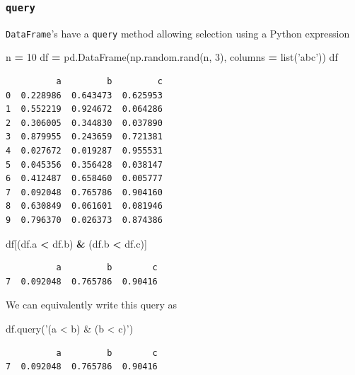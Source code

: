 \documentclass[
  letterpaper,
]{scrbook}
\newenvironment{Shaded}{\begin{snugshade}}{\end{snugshade}}
\newcommand{\BuiltInTok}[1]{#1}
\newcommand{\DecValTok}[1]{\textcolor[rgb]{0.00,0.00,0.81}{#1}}
\newcommand{\NormalTok}[1]{#1}
\newcommand{\OperatorTok}[1]{\textcolor[rgb]{0.81,0.36,0.00}{\textbf{#1}}}
\newcommand{\StringTok}[1]{\textcolor[rgb]{0.31,0.60,0.02}{#1}}
\begin{document}
\hypertarget{query}{%
\subsubsection{\texorpdfstring{\texttt{query}}{query}}\label{query}}

\texttt{DataFrame}'s have a \texttt{query} method allowing selection using a Python expression

\begin{Shaded}
\begin{Highlighting}[]
\NormalTok{n }\OperatorTok{=} \DecValTok{10}
\NormalTok{df }\OperatorTok{=}\NormalTok{ pd.DataFrame(np.random.rand(n, }\DecValTok{3}\NormalTok{), columns }\OperatorTok{=} \BuiltInTok{list}\NormalTok{(}\StringTok{'abc'}\NormalTok{))}
\NormalTok{df}
\end{Highlighting}
\end{Shaded}

\begin{verbatim}
          a         b         c
0  0.228986  0.643473  0.625953
1  0.552219  0.924672  0.064286
2  0.306005  0.344830  0.037890
3  0.879955  0.243659  0.721381
4  0.027672  0.019287  0.955531
5  0.045356  0.356428  0.038147
6  0.412487  0.658460  0.005777
7  0.092048  0.765786  0.904160
8  0.630849  0.061601  0.081946
9  0.796370  0.026373  0.874386
\end{verbatim}

\begin{Shaded}
\begin{Highlighting}[]
\NormalTok{df[(df.a }\OperatorTok{<}\NormalTok{ df.b) }\OperatorTok{&}\NormalTok{ (df.b }\OperatorTok{<}\NormalTok{ df.c)]}
\end{Highlighting}
\end{Shaded}

\begin{verbatim}
          a         b        c
7  0.092048  0.765786  0.90416
\end{verbatim}

We can equivalently write this query as

\begin{Shaded}
\begin{Highlighting}[]
\NormalTok{df.query(}\StringTok{'(a < b) & (b < c)'}\NormalTok{)}
\end{Highlighting}
\end{Shaded}

\begin{verbatim}
          a         b        c
7  0.092048  0.765786  0.90416
\end{verbatim}
\end{document}
